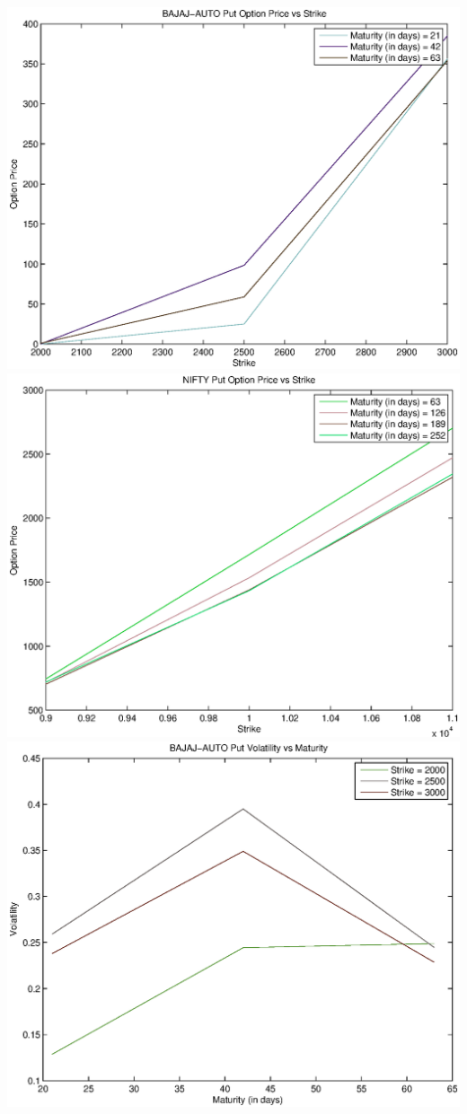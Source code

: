 \documentclass{article}
\begin{document}
\includegraphics[width=\textwidth]{BAJAJ-AUTO_Put_Option_Price_vs_Strike} \\               
\includegraphics[width=\textwidth]{NIFTY_Put_Option_Price_vs_Strike} \\
\includegraphics[width=\textwidth]{BAJAJ-AUTO_Put_Volatility_vs_Maturity} \\               
\end{document}
